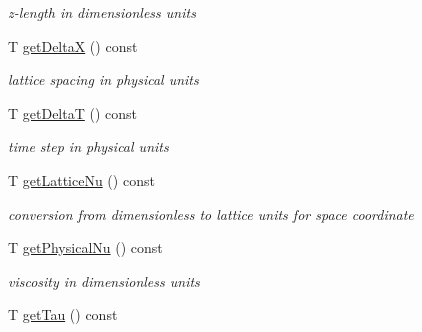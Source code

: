 \begin{DoxyCompactItemize}
\begin{DoxyCompactList}\small\item\em z-\/length in dimensionless units \item\end{DoxyCompactList}\item 
\hypertarget{classplb_1_1ModIncomprFlowParam_acae189ae96277903a256fd5981971ae0}{
T \hyperlink{classplb_1_1ModIncomprFlowParam_acae189ae96277903a256fd5981971ae0}{getDeltaX} () const }
\label{classplb_1_1ModIncomprFlowParam_acae189ae96277903a256fd5981971ae0}

\begin{DoxyCompactList}\small\item\em lattice spacing in physical units \item\end{DoxyCompactList}\item 
\hypertarget{classplb_1_1ModIncomprFlowParam_a62c717dad7234760ccc86c16eb9ab3a2}{
T \hyperlink{classplb_1_1ModIncomprFlowParam_a62c717dad7234760ccc86c16eb9ab3a2}{getDeltaT} () const }
\label{classplb_1_1ModIncomprFlowParam_a62c717dad7234760ccc86c16eb9ab3a2}

\begin{DoxyCompactList}\small\item\em time step in physical units \item\end{DoxyCompactList}\item 
\hypertarget{classplb_1_1ModIncomprFlowParam_abcb0313f972db74d7883e9b6be0817d7}{
T \hyperlink{classplb_1_1ModIncomprFlowParam_abcb0313f972db74d7883e9b6be0817d7}{getLatticeNu} () const }
\label{classplb_1_1ModIncomprFlowParam_abcb0313f972db74d7883e9b6be0817d7}

\begin{DoxyCompactList}\small\item\em conversion from dimensionless to lattice units for space coordinate \item\end{DoxyCompactList}\item 
\hypertarget{classplb_1_1ModIncomprFlowParam_a6a169dfd3a1a02071aa64e838240fde9}{
T \hyperlink{classplb_1_1ModIncomprFlowParam_a6a169dfd3a1a02071aa64e838240fde9}{getPhysicalNu} () const }
\label{classplb_1_1ModIncomprFlowParam_a6a169dfd3a1a02071aa64e838240fde9}

\begin{DoxyCompactList}\small\item\em viscosity in dimensionless units \item\end{DoxyCompactList}\item 
\hypertarget{classplb_1_1ModIncomprFlowParam_adbd07104d7d7e4dafe827f4a247e57f0}{
T \hyperlink{classplb_1_1ModIncomprFlowParam_adbd07104d7d7e4dafe827f4a247e57f0}{getTau} () const }
\label{classplb_1_1ModIncomprFlowParam_adbd07104d7d7e4dafe827f4a247e57f0}


\end{DoxyCompactItemize}

